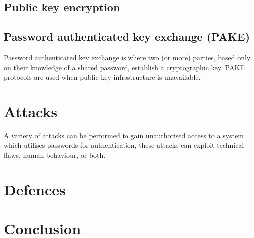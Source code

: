 \documentclass[11pt]{article}
\begin{document}
\subsection{Public key encryption}

\subsection{Password authenticated key exchange (PAKE)}
Password authenticated key exchange is where two (or more) parties, based only on their knowledge of a shared password, establish a cryptographic key.
PAKE protocols are used when public key infrastructure is unavailable.


\section{Attacks} \label{ATK}
A variety of attacks can be performed to gain unauthorised access to a system which utilises passwords for authentication, these attacks can exploit technical flaws, human behaviour, or both.


\section{Defences} \label{DEF}


\section{Conclusion} \label{CONCL}




\end{document}
